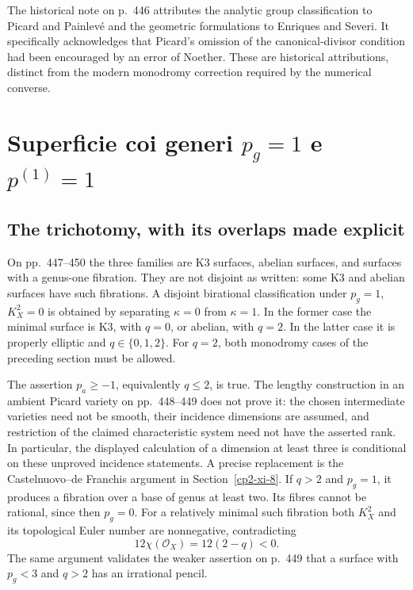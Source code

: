 The historical note on p.~446 attributes the analytic group classification to Picard and Painlev\'e and the geometric formulations to Enriques and Severi. It specifically acknowledges that Picard's omission of the canonical-divisor condition had been encouraged by an error of Noether. These are historical attributions, distinct from the modern monodromy correction required by the numerical converse.

\section[Superficie con genere geometrico e lineare uno]{Superficie coi generi \texorpdfstring{\(p_g=1\)}{pg = 1} e \texorpdfstring{\(p^{(1)}=1\)}{p(1) = 1}}
\label{cp2-xi-5}

\subsection{The trichotomy, with its overlaps made explicit}

On pp.~447--450 the three families are K3 surfaces, abelian surfaces, and surfaces with a genus-one fibration. They are not disjoint as written: some K3 and abelian surfaces have such fibrations. A disjoint birational classification under \(p_g=1\), \(K_X^2=0\) is obtained by separating \(\kappa=0\) from \(\kappa=1\). In the former case the minimal surface is K3, with \(q=0\), or abelian, with \(q=2\). In the latter case it is properly elliptic and \(q\in\{0,1,2\}\). For \(q=2\), both monodromy cases of the preceding section must be allowed.

The assertion \(p_a\ge-1\), equivalently \(q\le2\), is true. The lengthy construction in an ambient Picard variety on pp.~448--449 does not prove it: the chosen intermediate varieties need not be smooth, their incidence dimensions are assumed, and restriction of the claimed characteristic system need not have the asserted rank. In particular, the displayed calculation of a dimension at least three is conditional on these unproved incidence statements. A precise replacement is the Castelnuovo--de Franchis argument in Section~\ref{cp2-xi-8}. If \(q>2\) and \(p_g=1\), it produces a fibration over a base of genus at least two. Its fibres cannot be rational, since then \(p_g=0\). For a relatively minimal such fibration both \(K_X^2\) and its topological Euler number are nonnegative, contradicting
\[
12\chi(\mathcal O_X)=12(2-q)<0.
\]
The same argument validates the weaker assertion on p.~449 that a surface with \(p_g<3\) and \(q>2\) has an irrational pencil.

